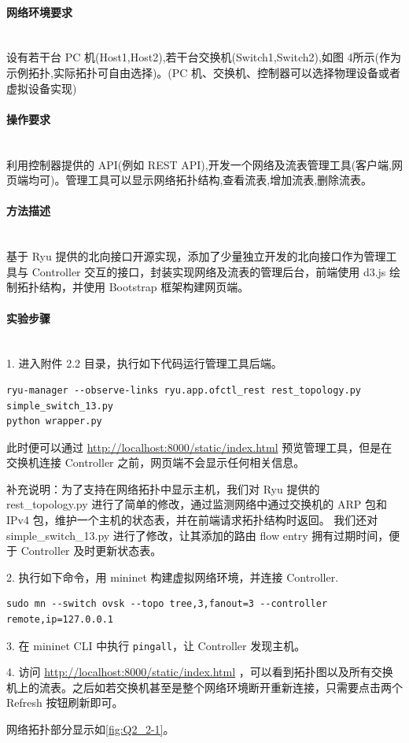 \documentclass[format=draft,language=chinese,category=SDN]{hustreport}
\newcommand{\myparagraph}[1]{\paragraph{#1}\mbox{}\\}
\newcommand{\code}{\texttt}
\begin{document}
\myparagraph{网络环境要求}

设有若干台 PC 机(Host1,Host2),若干台交换机(Switch1,Switch2),如图 4所示(作为示例拓扑,实际拓扑可自由选择)。(PC 机、交换机、控制器可以选择物理设备或者虚拟设备实现)

\myparagraph{操作要求}

利用控制器提供的 API(例如 REST API),开发一个网络及流表管理工具(客户端,网页端均可)。管理工具可以显示网络拓扑结构,查看流表,增加流表,删除流表。

\myparagraph{方法描述}

基于 Ryu 提供的北向接口开源实现，添加了少量独立开发的北向接口作为管理工具与 Controller 交互的接口，封装实现网络及流表的管理后台，前端使用 d3.js 绘制拓扑结构，并使用 Bootstrap 框架构建网页端。

\myparagraph{实验步骤}

1. 进入附件 2.2 目录，执行如下代码运行管理工具后端。

\begin{lstlisting}
ryu-manager --observe-links ryu.app.ofctl_rest rest_topology.py simple_switch_13.py
python wrapper.py
\end{lstlisting}

此时便可以通过 \url{http://localhost:8000/static/index.html} 预览管理工具，但是在交换机连接 Controller 之前，网页端不会显示任何相关信息。

补充说明：为了支持在网络拓扑中显示主机，我们对 Ryu 提供的 rest\_topology.py 进行了简单的修改，通过监测网络中通过交换机的 ARP 包和 IPv4 包，维护一个主机的状态表，并在前端请求拓扑结构时返回。 我们还对 simple\_switch\_13.py 进行了修改，让其添加的路由 flow entry 拥有过期时间，便于 Controller 及时更新状态表。

2. 执行如下命令，用 mininet 构建虚拟网络环境，并连接 Controller.
\begin{lstlisting}
sudo mn --switch ovsk --topo tree,3,fanout=3 --controller remote,ip=127.0.0.1
\end{lstlisting}

3. 在 mininet CLI 中执行 \code{pingall}，让 Controller 发现主机。

4. 访问 \url{http://localhost:8000/static/index.html} ，可以看到拓扑图以及所有交换机上的流表。之后如若交换机甚至是整个网络环境断开重新连接，只需要点击两个 Refresh 按钮刷新即可。

网络拓扑部分显示如\autoref{fig:Q2_2-1}。
\end{document}
